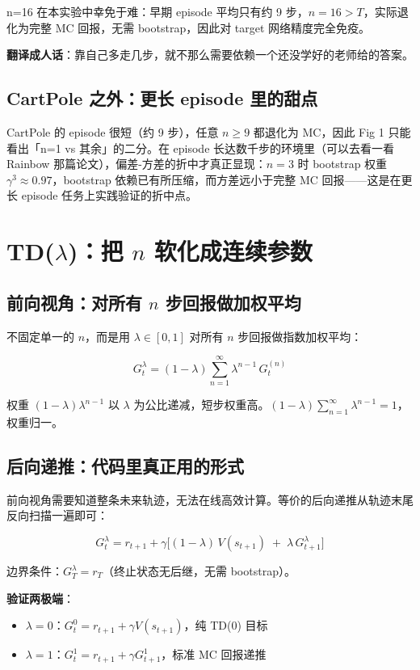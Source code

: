 \documentclass{article}
\begin{document}
n=16 在本实验中幸免于难：早期 episode 平均只有约 9 步，$n=16 > T$，实际退化为完整 MC 回报，无需 bootstrap，因此对 target 网络精度完全免疫。

\textbf{翻译成人话}：靠自己多走几步，就不那么需要依赖一个还没学好的老师给的答案。

\subsection*{CartPole 之外：更长 episode 里的甜点}

CartPole 的 episode 很短（约 9 步），任意 $n \ge 9$ 都退化为 MC，因此 Fig 1 只能看出「n=1 vs 其余」的二分。在 episode 长达数千步的环境里（可以去看一看 Rainbow 那篇论文），偏差-方差的折中才真正显现：$n=3$ 时 bootstrap 权重 $\gamma^3 \approx 0.97$，bootstrap 依赖已有所压缩，而方差远小于完整 MC 回报——这是在更长 episode 任务上实践验证的折中点。

\section*{TD($\lambda$)：把 $n$ 软化成连续参数}

\subsection*{前向视角：对所有 $n$ 步回报做加权平均}

不固定单一的 $n$，而是用 $\lambda \in [0,1]$ 对所有 $n$ 步回报做指数加权平均：

\[
\boxed{G_t^\lambda = (1-\lambda) \sum_{n=1}^{\infty} \lambda^{n-1}\, G_t^{(n)}}
\]

权重 $(1-\lambda)\lambda^{n-1}$ 以 $\lambda$ 为公比递减，短步权重高。$(1-\lambda) \sum_{n=1}^\infty \lambda^{n-1} = 1$，权重归一。

\subsection*{后向递推：代码里真正用的形式}

前向视角需要知道整条未来轨迹，无法在线高效计算。等价的后向递推从轨迹末尾反向扫描一遍即可：

\[
\boxed{G_t^\lambda = r_{t+1} + \gamma\bigl[(1-\lambda)\,V(s_{t+1}) \;+\; \lambda\, G_{t+1}^\lambda\bigr]}
\]

边界条件：$G_T^\lambda = r_T$（终止状态无后继，无需 bootstrap）。

\textbf{验证两极端}：
\begin{itemize}
  \item $\lambda=0$：$G_t^0 = r_{t+1} + \gamma V(s_{t+1})$，纯 TD(0) 目标 \checkmark
  \item $\lambda=1$：$G_t^1 = r_{t+1} + \gamma G_{t+1}^1$，标准 MC 回报递推 \checkmark
\end{itemize}
\end{document}
